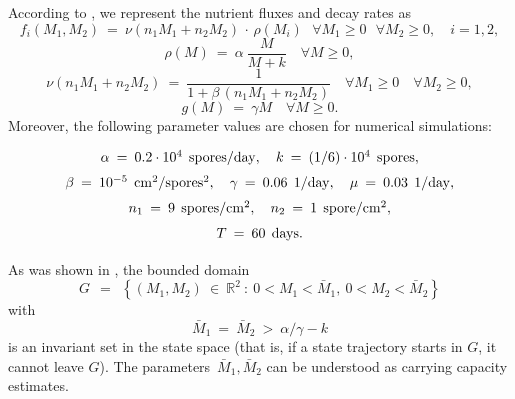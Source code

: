 \documentclass[a4paper,12pt]{article}
\begin{document}
According to \cite{YegorovGrognardMailleretHalkettBernhard2019}, we represent the nutrient fluxes and decay rates as
\begin{equation}
f_i(M_1, M_2) \: = \: \nu(n_1 M_1 + n_2 M_2) \, \cdot \, \rho(M_i) \:\:\:
\forall M_1 \geqslant 0 \:\:\: \forall M_2 \geqslant 0, \quad i = 1,2,  \label{4}
\end{equation}
\begin{equation}
\rho(M) \: = \: \alpha \: \dfrac{M}{M + k} \quad \forall M \geqslant 0,  \label{5_1}
\end{equation}
\begin{equation}
\nu(n_1 M_1 + n_2 M_2) \: = \: \dfrac{1}{1 + \beta \, (n_1 M_1 + n_2 M_2)} \quad
\forall M_1 \geqslant 0 \quad \forall M_2 \geqslant 0,  \label{5_2}
\end{equation}
\begin{equation}
g(M) \: = \: \gamma M \quad \forall M \geqslant 0.  \label{6}
\end{equation}
Moreover, the following parameter values are chosen for numerical simulations:
\begin{equation}
\arraycolsep=1.3pt
\def\arraystretch{1.5}
\begin{array}{c}
\alpha \: = \: 0.2 \cdot 10^4 \:\: \mathrm{spores} / \mathrm{day}, \quad
k \: = \: (1/6) \cdot 10^4 \:\: \mathrm{spores}, \\
\beta \: = \: 10^{-5} \:\: \mathrm{cm}^2 / \mathrm{spores}^2, \quad \gamma \: = \: 0.06 \:\: 1 / \mathrm{day}, \quad
\mu \: = \: 0.03 \:\: 1 / \mathrm{day}, \\
n_1 \: = \: 9 \:\: \mathrm{spores} / \mathrm{cm}^2, \quad n_2 \: = \: 1 \:\: \mathrm{spore} / \mathrm{cm}^2, \\
T \: = \: 60 \:\: \mathrm{days}.
\end{array}  \label{19}
\end{equation}

As was shown in \cite{YegorovGrognardMailleretHalkettBernhard2019}, the bounded domain
\begin{equation}
G \:\: = \:\: \left\{ (M_1, M_2) \: \in \: \mathbb{R}^2 \: \colon \: 0 < M_1 < \bar{M}_1, \:
0 < M_2 < \bar{M}_2 \right\}  \label{2}
\end{equation}
with
\begin{equation}
\bar{M}_1 \: = \: \bar{M}_2 \: > \: \alpha / \gamma - k  \label{2_1}
\end{equation}
is an invariant set in the state space (that is, if a state trajectory starts in $ G $, it cannot leave $ G $).
The parameters~$ \bar{M}_1, \bar{M}_2 $ can be understood as carrying capacity estimates.
\end{document}
